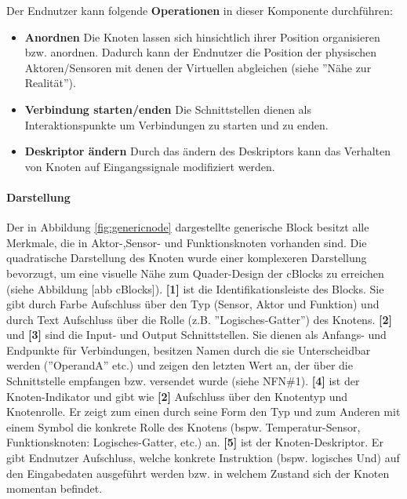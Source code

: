 Der Endnutzer kann folgende \textbf{Operationen} in dieser Komponente durchführen: 
\begin{itemize}
    \item \textbf{Anordnen} Die Knoten lassen sich hinsichtlich ihrer Position organisieren bzw. anordnen. Dadurch kann der Endnutzer die Position der physischen Aktoren/Sensoren mit denen der Virtuellen abgleichen (siehe ''Nähe zur Realität'').
    \item \textbf{Verbindung starten/enden} Die Schnittstellen dienen als Interaktionspunkte um Verbindungen zu starten und zu enden.
    \item \textbf{Deskriptor ändern} Durch das ändern des Deskriptors kann das Verhalten von Knoten auf Eingangssignale modifiziert werden.
\end{itemize}

\paragraph{Darstellung} Der in Abbildung \ref{fig:genericnode} dargestellte generische Block besitzt alle Merkmale, die in Aktor-,Sensor- und Funktionsknoten vorhanden sind. Die quadratische Darstellung des Knoten wurde einer komplexeren Darstellung bevorzugt, um eine visuelle Nähe zum Quader-Design der cBlocks zu erreichen (siehe Abbildung [abb cBlocks]). \textbf{[1]} ist die Identifikationsleiste des Blocks. Sie gibt durch Farbe Aufschluss über den Typ (\colorbox{sensororange}{Sensor}, \colorbox{aktorgreen}{Aktor} und \colorbox{funcviolet}{Funktion}) und durch Text Aufschluss über die Rolle (z.B. ''Logisches-Gatter'') des Knotens. \textbf{[2]} und \textbf{[3]} sind die Input- und Output Schnittstellen. Sie dienen als Anfangs- und Endpunkte für Verbindungen, besitzen Namen durch die sie Unterscheidbar werden (''OperandA'' etc.) und zeigen den letzten Wert an, der über die Schnittstelle empfangen bzw. versendet wurde (siehe NFN\#1). \textbf{[4]} ist der Knoten-Indikator und gibt wie \textbf{[2]} Aufschluss über den Knotentyp und Knotenrolle. Er zeigt zum einen durch seine Form den Typ und zum Anderen mit einem Symbol die konkrete Rolle des Knotens (bspw. Temperatur-Sensor, Funktionsknoten: Logisches-Gatter, etc.) an. \textbf{[5]} ist der Knoten-Deskriptor. Er gibt Endnutzer Aufschluss, welche konkrete Instruktion (bspw. logisches Und) auf den Eingabedaten ausgeführt werden bzw. in welchem Zustand sich der Knoten momentan befindet.


